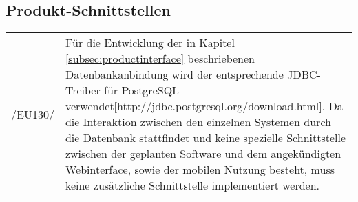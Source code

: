 \subsection{Produkt-Schnittstellen}

\begin{tabular}{p{1.5cm}p{14.5cm}}

	 /EU130/	&  Für die Entwicklung der in Kapitel \ref{subsec:productinterface} beschriebenen Datenbankanbindung wird der entsprechende JDBC-Treiber für PostgreSQL verwendet[http://jdbc.postgresql.org/download.html].
Da die Interaktion zwischen den einzelnen Systemen durch die Datenbank stattfindet und keine spezielle Schnittstelle zwischen der geplanten Software und dem angekündigten Webinterface, sowie der mobilen Nutzung besteht, muss keine zusätzliche Schnittstelle implementiert werden.\\[0.25cm]

\end{tabular}

